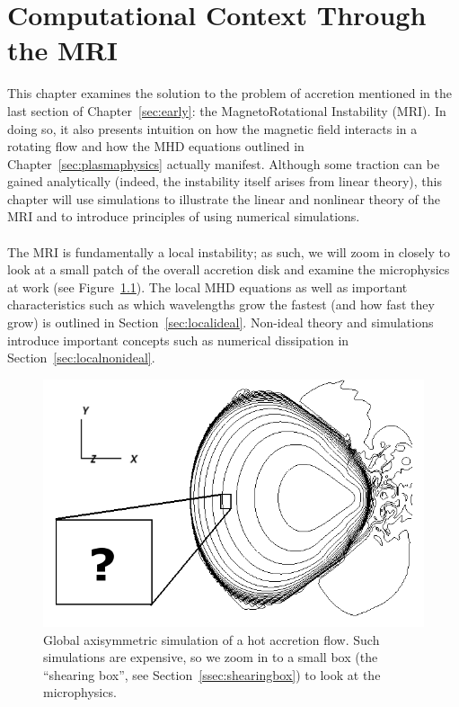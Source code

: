 \chapter{Computational Context Through the MRI} \label{chap:compMRI}
This chapter examines the solution to the problem of accretion mentioned in the last section of Chapter~\ref{sec:early}: the MagnetoRotational Instability (MRI). In doing so, it also presents intuition on how the magnetic field interacts in a rotating flow and how the MHD equations outlined in Chapter~\ref{sec:plasmaphysics} actually manifest. Although some traction can be gained analytically (indeed, the instability itself arises from linear theory), this chapter will use simulations to illustrate the linear and nonlinear theory of the MRI and to introduce principles of using numerical simulations. \\
\\
The MRI is fundamentally a local instability; as such, we will zoom in closely to look at a small patch of the overall accretion disk and examine the microphysics at work (see Figure~\ref{fig:global}). The local MHD equations as well as important characteristics such as which wavelengths grow the fastest (and how fast they grow) is outlined in Section~\ref{sec:localideal}. Non-ideal theory and simulations introduce important concepts such as numerical dissipation in Section~\ref{sec:localnonideal}. 
\begin{figure}[h]
  \begin{center}  
    \includegraphics[width=.9\textwidth, angle=0.]{img/global.png}
  \end{center}
  \caption{Global axisymmetric simulation of a hot accretion flow. Such simulations are expensive, so we zoom in to a small box (the ``shearing box'', see Section~\ref{ssec:shearingbox}) to look at the microphysics.}
  \label{fig:global}
\end{figure}

